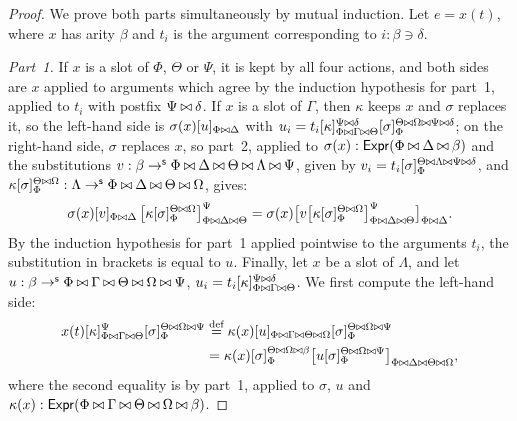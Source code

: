 \begin{proof}
    We prove both parts simultaneously by mutual induction. Let $e = x(t)$, where $x$ has arity $\beta$ and $t_i$ is the argument corresponding to $i : \beta \ni \delta$.

    \emph{Part~1.} If $x$ is a slot of $\Phi$, $\Theta$ or $\Psi$, it is kept by all four actions, and both sides are $x$ applied to arguments which agree by the induction hypothesis for part~1, applied to $t_i$ with postfix $\Psi \mathbin{\bowtie} \delta$. If $x$ is a slot of $\Gamma$, then $\kappa$ keeps $x$ and $\sigma$ replaces it, so the left-hand side is $\sigma(x)[u]_{\Phi \mathbin{\bowtie} \Delta}$ with $u_i = t_i[\kappa]_{\Phi \mathbin{\bowtie} \Gamma \mathbin{\bowtie} \Theta}^{\Psi \mathbin{\bowtie} \delta}[\sigma]_\Phi^{\Theta \mathbin{\bowtie} \Omega \mathbin{\bowtie} \Psi \mathbin{\bowtie} \delta}$; on the right-hand side, $\sigma$ replaces $x$, so part~2, applied to $\sigma(x) : \mathsf{Expr}(\Phi \mathbin{\bowtie} \Delta \mathbin{\bowtie} \beta)$ and the substitutions $v : \beta \to^{\mathsf{s}} \Phi \mathbin{\bowtie} \Delta \mathbin{\bowtie} \Theta \mathbin{\bowtie} \Lambda \mathbin{\bowtie} \Psi$, given by $v_i = t_i[\sigma]_\Phi^{\Theta \mathbin{\bowtie} \Lambda \mathbin{\bowtie} \Psi \mathbin{\bowtie} \delta}$, and $\kappa[\sigma]_\Phi^{\Theta \mathbin{\bowtie} \Omega} : \Lambda \to^{\mathsf{s}} \Phi \mathbin{\bowtie} \Delta \mathbin{\bowtie} \Theta \mathbin{\bowtie} \Omega$, gives:
    \[
    \sigma(x)[v]_{\Phi \mathbin{\bowtie} \Delta}\,\big[\kappa[\sigma]_\Phi^{\Theta \mathbin{\bowtie} \Omega}\big]_{\Phi \mathbin{\bowtie} \Delta \mathbin{\bowtie} \Theta}^{\Psi}
    = \sigma(x)\big[v\big[\kappa[\sigma]_\Phi^{\Theta \mathbin{\bowtie} \Omega}\big]_{\Phi \mathbin{\bowtie} \Delta \mathbin{\bowtie} \Theta}^{\Psi}\big]_{\Phi \mathbin{\bowtie} \Delta}.
    \]
    By the induction hypothesis for part~1 applied pointwise to the arguments $t_i$, the substitution in brackets is equal to $u$. 
    Finally, let $x$ be a slot of $\Lambda$, and let $u : \beta \to^{\mathsf{s}} \Phi \mathbin{\bowtie} \Gamma \mathbin{\bowtie} \Theta \mathbin{\bowtie} \Omega \mathbin{\bowtie} \Psi$, $u_i = t_i[\kappa]_{\Phi \mathbin{\bowtie} \Gamma \mathbin{\bowtie} \Theta}^{\Psi \mathbin{\bowtie} \delta}$. We first compute the left-hand side:
    \begin{align*}
        x(t)[\kappa]_{\Phi \mathbin{\bowtie} \Gamma \mathbin{\bowtie} \Theta}^{\Psi}[\sigma]_\Phi^{\Theta \mathbin{\bowtie} \Omega \mathbin{\bowtie} \Psi}
        &\overset{\textnormal{def}}{=} \kappa(x)[u]_{\Phi \mathbin{\bowtie} \Gamma \mathbin{\bowtie} \Theta \mathbin{\bowtie} \Omega}[\sigma]_\Phi^{\Theta \mathbin{\bowtie} \Omega \mathbin{\bowtie} \Psi}\\
        &= \kappa(x)[\sigma]_\Phi^{\Theta \mathbin{\bowtie} \Omega \mathbin{\bowtie} \beta}\big[u[\sigma]_\Phi^{\Theta \mathbin{\bowtie} \Omega \mathbin{\bowtie} \Psi}\big]_{\Phi \mathbin{\bowtie} \Delta \mathbin{\bowtie} \Theta \mathbin{\bowtie} \Omega},
    \end{align*}
    where the second equality is by part~1, applied to $\sigma$, $u$ and $\kappa(x) : \mathsf{Expr}(\Phi \mathbin{\bowtie} \Gamma \mathbin{\bowtie} \Theta \mathbin{\bowtie} \Omega \mathbin{\bowtie} \beta)$. 
    

\end{proof}
